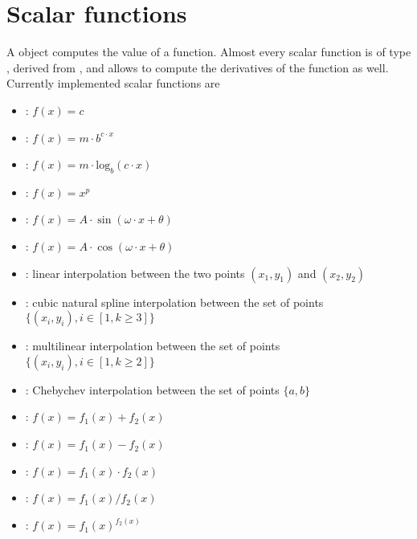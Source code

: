 %
%
%
%
%
%
%
%

\section{Scalar functions}\label{sec:ScalarFunction}
A  object computes the value of a function.
Almost every scalar function is of type ,
derived from , and allows to compute the derivatives of
the function as well. Currently implemented scalar functions are
\begin{itemize}
\item {}: $f(x)=c$
\item {}: $f(x)=m\cdot b^{c\cdot{x}}$
\item {}: $f(x)=m\cdot\textrm{log}_b(c\cdot{x})$
\item {}: $f(x)=x^p$
\item {}: $f(x)=A \cdot \sin(\omega \cdot x + \theta)$
\item {}: $f(x)=A \cdot \cos(\omega \cdot x + \theta)$
\item {}: linear interpolation between the two points $(x_1,y_1)$
and $(x_2,y_2)$
\item {}: cubic natural spline interpolation between the
set of points $\{(x_i,y_i), i\in[1,k\geq3]\}$
\item {}: multilinear interpolation between the
set of points $\{(x_i,y_i), i\in[1,k\geq2]\}$
\item {}: Chebychev interpolation between the
set of points $\{a,b\}$
\item {}: $f(x)=f_1(x) + f_2(x)$
\item {}: $f(x)=f_1(x) - f_2(x)$
\item {}: $f(x)=f_1(x) \cdot f_2(x)$
\item {}: $f(x)=f_1(x) / f_2(x)$
\item {}: $f(x)=f_1(x) ^{f_2(x)}$
\end{itemize}

